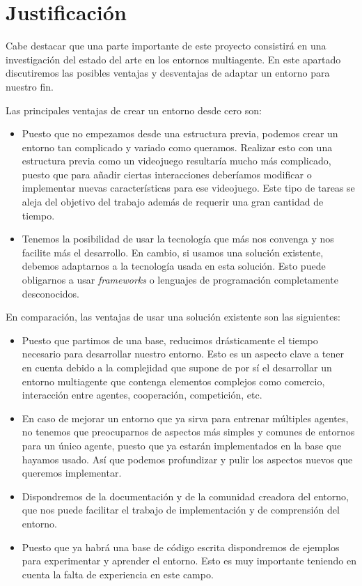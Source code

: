 \section{Justificación}
Cabe destacar que una parte importante de este proyecto consistirá en una investigación del estado del arte en los entornos multiagente.  En este apartado discutiremos las posibles ventajas y desventajas de adaptar un entorno para nuestro fin.

Las principales ventajas de crear un entorno desde cero son:
\begin{itemize}
    \item Puesto que no empezamos desde una estructura previa, podemos crear un entorno tan complicado y variado como queramos. Realizar esto con una estructura previa como un videojuego resultaría mucho más complicado, puesto que para añadir ciertas interacciones deberíamos modificar o implementar nuevas características para ese videojuego. Este tipo de tareas se aleja del objetivo del trabajo además de requerir una gran cantidad de tiempo.
    \item Tenemos la posibilidad de usar la tecnología que más nos convenga y nos facilite más el desarrollo. En cambio, si usamos una solución existente, debemos adaptarnos a la tecnología usada en esta solución. Esto puede obligarnos a usar \emph{frameworks} o lenguajes de programación completamente desconocidos.  
\end{itemize}

En comparación, las ventajas de usar una solución existente son las siguientes:

\begin{itemize}
    \item Puesto que partimos de una base, reducimos drásticamente el tiempo necesario para desarrollar nuestro entorno. Esto es un aspecto clave a tener en cuenta debido a la complejidad que supone de por sí el desarrollar un entorno multiagente que contenga elementos complejos como comercio, interacción entre agentes, cooperación, competición, etc.
    \item En caso de mejorar un entorno que ya sirva para entrenar múltiples agentes, no tenemos que preocuparnos de aspectos más simples y comunes de entornos para un único agente, puesto que ya estarán implementados en la base que hayamos usado. Así que podemos profundizar y pulir los aspectos nuevos que queremos implementar.
    \item Dispondremos de la documentación y de la comunidad creadora del entorno, que nos puede facilitar el trabajo de implementación y de comprensión del entorno.
    \item Puesto que ya habrá una base de código escrita dispondremos de ejemplos para experimentar y aprender el entorno. Esto es muy importante teniendo en cuenta la falta de experiencia en este campo.
\end{itemize}

